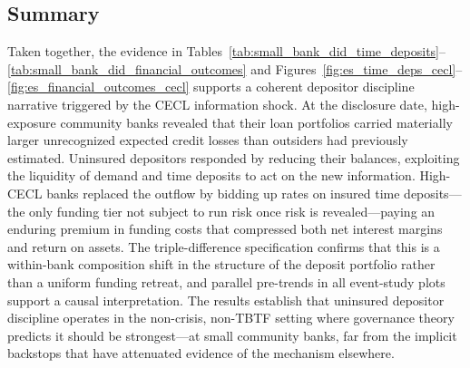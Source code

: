 \subsection{Summary}
\label{sec:results:summary}

Taken together, the evidence in Tables~\ref{tab:small_bank_did_time_deposits}--\ref{tab:small_bank_did_financial_outcomes}
and Figures~\ref{fig:es_time_deps_cecl}--\ref{fig:es_financial_outcomes_cecl}
supports a coherent depositor discipline narrative triggered by the CECL
information shock. At the disclosure date, high-exposure community banks
revealed that their loan portfolios carried materially larger unrecognized
expected credit losses than outsiders had previously estimated. Uninsured
depositors responded by reducing their balances, exploiting the liquidity of
demand and time deposits to act on the new information. High-CECL banks
replaced the outflow by bidding up rates on insured time deposits—the only
funding tier not subject to run risk once risk is revealed—paying an enduring
premium in funding costs that compressed both net interest margins and return on
assets. The triple-difference specification confirms that this is a within-bank
composition shift in the structure of the deposit portfolio rather than a
uniform funding retreat, and parallel pre-trends in all event-study plots
support a causal interpretation. The results establish that uninsured depositor
discipline operates in the non-crisis, non-TBTF setting where governance theory
predicts it should be strongest—at small community banks, far from the implicit
backstops that have attenuated evidence of the mechanism elsewhere.
